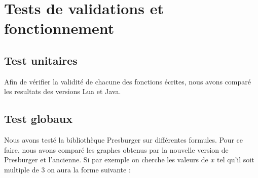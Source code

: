 \section{Tests de validations et fonctionnement}

\subsection{Test unitaires}

Afin de vérifier la validité de chacune des fonctions écrites, nous avons comparé les resultats des versions Lua et Java.

\subsection{Test globaux}

Nous avons testé la bibliothèque Presburger sur différentes formules. Pour ce faire, nous avons comparé les graphes obtenus par la nouvelle version de Presburger et l'ancienne. Si par exemple on cherche les valeurs de $x$ tel qu'il soit multiple de 3 on aura la forme suivante :

